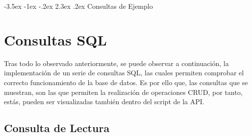 \documentclass[11pt]{report}
\makeatletter
\renewcommand\chapter{\@startsection{chapter}{0}{\z@}%
    {-3.5ex \@plus -1ex \@minus -.2ex}%
    {2.3ex \@plus.2ex}%
    {\normalfont\Large\bfseries}}
\makeatother
\begin{document}
\chapter{Consultas de Ejemplo}

\section{Consultas SQL}

Tras todo lo observado anteriormente, se puede observar a continuación, la implementación de un serie de consultas SQL, las cuales permiten comprobar el correcto funcionamiento de la base de datos. Es por ello que, las consultas que se muestran, son las que permiten la realización de operaciones CRUD, por tanto, estás, pueden ser visualizadas también dentro del script de la API.

\subsection{Consulta de Lectura}
\end{document}
